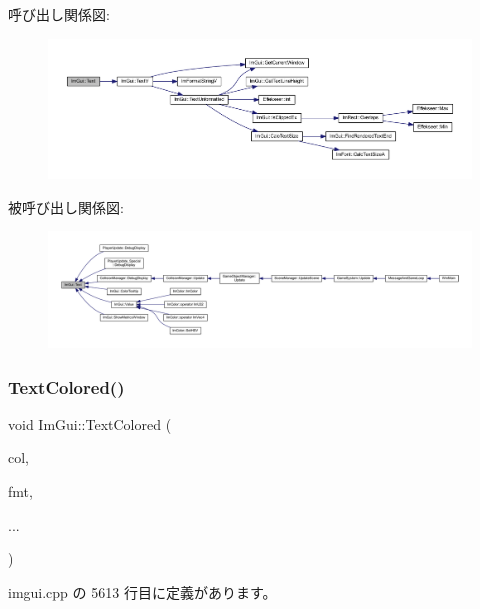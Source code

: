 呼び出し関係図\+:\nopagebreak
\begin{figure}[H]
\begin{center}
\leavevmode
\includegraphics[width=350pt]{namespace_im_gui_a9e7b83611fe441d54fad2effb4bf4965_cgraph}
\end{center}
\end{figure}
被呼び出し関係図\+:
\nopagebreak
\begin{figure}[H]
\begin{center}
\leavevmode
\includegraphics[width=350pt]{namespace_im_gui_a9e7b83611fe441d54fad2effb4bf4965_icgraph}
\end{center}
\end{figure}
\mbox{\label{namespace_im_gui_a36ab8fcad68b26863d6e910755de04c2}} 
\subsubsection{\texorpdfstring{Text\+Colored()}{TextColored()}}
{\footnotesize\ttfamily void Im\+Gui\+::\+Text\+Colored (\begin{DoxyParamCaption}\item[{const \mbox{\hyperlink{struct_im_vec4}{Im\+Vec4}} \&}]{col,  }\item[{const char $\ast$}]{fmt,  }\item[{}]{... }\end{DoxyParamCaption})}



 imgui.\+cpp の 5613 行目に定義があります。

